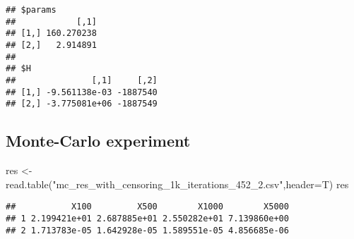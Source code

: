 \documentclass[
]{article}
\newenvironment{Shaded}{\begin{snugshade}}{\end{snugshade}}
\newcommand{\AttributeTok}[1]{\textcolor[rgb]{0.77,0.63,0.00}{#1}}
\newcommand{\FunctionTok}[1]{\textcolor[rgb]{0.00,0.00,0.00}{#1}}
\newcommand{\NormalTok}[1]{#1}
\newcommand{\OtherTok}[1]{\textcolor[rgb]{0.56,0.35,0.01}{#1}}
\newcommand{\StringTok}[1]{\textcolor[rgb]{0.31,0.60,0.02}{#1}}
\begin{document}
\begin{verbatim}
## $params
##            [,1]
## [1,] 160.270238
## [2,]   2.914891
## 
## $H
##               [,1]     [,2]
## [1,] -9.561138e-03 -1887540
## [2,] -3.775081e+06 -1887549
\end{verbatim}

\hypertarget{monte-carlo-experiment}{%
\subsection{Monte-Carlo experiment}\label{monte-carlo-experiment}}

\begin{Shaded}
\begin{Highlighting}[]
\NormalTok{res }\OtherTok{\textless{}{-}} \FunctionTok{read.table}\NormalTok{(}\StringTok{"mc\_res\_with\_censoring\_1k\_iterations\_452\_2.csv"}\NormalTok{,}\AttributeTok{header=}\NormalTok{T)}
\NormalTok{res}
\end{Highlighting}
\end{Shaded}

\begin{verbatim}
##           X100         X500        X1000        X5000
## 1 2.199421e+01 2.687885e+01 2.550282e+01 7.139860e+00
## 2 1.713783e-05 1.642928e-05 1.589551e-05 4.856685e-06
\end{verbatim}
\end{document}

